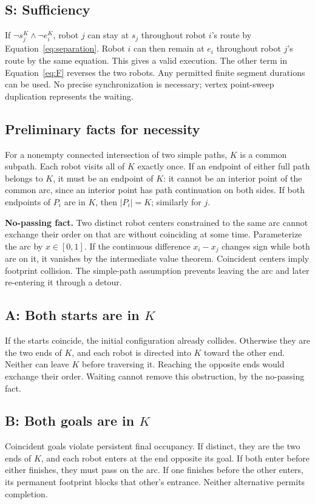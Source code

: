\documentclass[11pt,a4paper]{article}
\begin{document}
\subsection*{S: Sufficiency}
If $\neg s_j^K\land\neg e_i^K$, robot $j$ can stay at $s_j$ throughout
robot $i$'s route by Equation~\eqref{eq:separation}. Robot $i$ can then remain
at $e_i$ throughout robot $j$'s route by the same equation. This gives a valid
execution. The other term in Equation~\eqref{eq:F} reverses the two robots.
Any permitted finite segment durations can be used. No precise synchronization
is necessary; vertex point-sweep duplication represents the waiting.

\subsection*{Preliminary facts for necessity}
For a nonempty connected intersection of two simple paths, $K$ is a common
subpath. Each robot visits all of $K$ exactly once. If an endpoint of either
full path belongs to $K$, it must be an endpoint of $K$: it cannot be an interior
point of the common arc, since an interior point has path continuation on both
sides. If both endpoints of $P_i$ are in $K$, then $|P_i|=K$; similarly for $j$.

\textbf{No-passing fact.} Two distinct robot centers constrained to the same
arc cannot exchange their order on that arc without coinciding at some time.
Parameterize the arc by $x\in[0,1]$. If the continuous difference $x_i-x_j$
changes sign while both are on it, it vanishes by the intermediate value
theorem. Coincident centers imply footprint collision. The simple-path
assumption prevents leaving the arc and later re-entering it through a detour.

\subsection*{A: Both starts are in $K$}
If the starts coincide, the initial configuration already collides. Otherwise
they are the two ends of $K$, and each robot is directed into $K$ toward the
other end. Neither can leave $K$ before traversing it. Reaching the opposite
ends would exchange their order. Waiting cannot remove this obstruction, by
the no-passing fact.

\subsection*{B: Both goals are in $K$}
Coincident goals violate persistent final occupancy. If distinct, they are the
two ends of $K$, and each robot enters at the end opposite its goal. If both
enter before either finishes, they must pass on the arc. If one finishes
before the other enters, its permanent footprint blocks that other's entrance.
Neither alternative permits completion.
\end{document}

